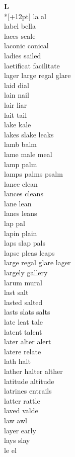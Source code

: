 \vspace{14pt}
\noindent\textbf{\Large L}\\*[+12pt]
la al\\
label bella\\
laces scale\\
laconic conical\\
ladies sailed\\
laetificat facilitate\\
lager large regal glare\\
laid dial\\
lain nail\\
lair liar\\
lait tail\\
lake kale\\
lakes slake leaks\\
lamb balm\\
lame male meal\\
lamp palm\\
lamps palms psalm\\
lance clean\\
lances cleans\\
lane lean\\
lanes leans\\
lap pal\\
lapin plain\\
laps slap pals\\
lapse pleas leaps\\
large regal glare lager\\
largely gallery\\
larum mural\\
last salt\\
lasted salted\\
lasts slats salts\\
late leat tale\\
latent talent\\
later alter alert\\
latere relate\\
lath halt\\
lather halter alther\\
latitude altitude\\
latrines entrails\\
latter rattle\\
laved valde\\
law awl\\
layer early\\
lays slay\\
le el\\
